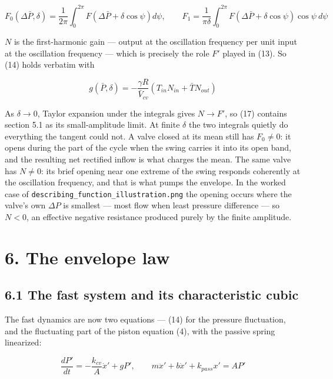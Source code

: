 \documentclass[11pt]{article}
\begin{document}
\begin{equation}
F_0(\Delta\bar P, \delta) = \frac{1}{2\pi}\int_0^{2\pi}F(\Delta\bar P + \delta\cos\psi)d\psi, \qquad F_1 = \frac{1}{\pi\delta}\int_0^{2\pi}F(\Delta\bar P + \delta\cos\psi)\cos\psi~d\psi \tag{16}
\end{equation}

$N$ is the first-harmonic gain --- output at the oscillation frequency per unit input at the oscillation frequency --- which is precisely the role $F'$ played in (13). So (14) holds verbatim with

\begin{equation}
g(\bar P, \delta) = -\frac{\gamma R}{\bar V_{cv}}\left(T_{in}N_{in} + \bar TN_{out}\right) \tag{17}
\end{equation}

As $\delta \to 0$, Taylor expansion under the integrals gives $N \to F'$, so (17) contains section 5.1 as its small-amplitude limit. At finite $\delta$ the two integrals quietly do everything the tangent could not. A valve closed at its mean still has $F_0 \neq 0$: it opens during the part of the cycle when the swing carries it into its open band, and the resulting net rectified inflow is what charges the mean. The same valve has $N \neq 0$: its brief opening near one extreme of the swing responds coherently at the oscillation frequency, and that is what pumps the envelope. In the worked case of \texttt{describing\_function\_illustration.png} the opening occurs where the valve's own $\Delta P$ is smallest --- most flow when least pressure difference --- so $N < 0$, an effective negative resistance produced purely by the finite amplitude.

\section*{6. The envelope law}

\subsection*{6.1 The fast system and its characteristic cubic}

The fast dynamics are now two equations --- (14) for the pressure fluctuation, and the fluctuating part of the piston equation (4), with the passive spring linearized:

\begin{equation}
\frac{dP'}{dt} = -\frac{k_{cv}}{A}\dot x' + gP', \qquad m\ddot x' + b\dot x' + k_{pass}x' = AP' \tag{18}
\end{equation}
\end{document}
